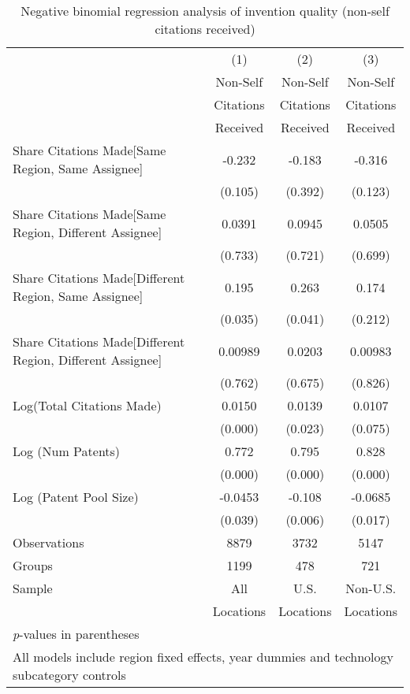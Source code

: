 {
\def\sym#1{\ifmmode^{#1}\else\(^{#1}\)\fi}
\begin{longtable}{l*{3}{c}}
\caption{Negative binomial regression analysis of invention quality (non-self citations received) \label{model192021}}\\
\hline\hline\endfirsthead\hline\endhead\hline\endfoot\endlastfoot
                &\multicolumn{1}{c}{(1)}&\multicolumn{1}{c}{(2)}&\multicolumn{1}{c}{(3)}\\
                &\multicolumn{1}{c}{Non-Self}&\multicolumn{1}{c}{Non-Self}&\multicolumn{1}{c}{Non-Self}\\
                &\multicolumn{1}{c}{Citations}&\multicolumn{1}{c}{Citations}&\multicolumn{1}{c}{Citations}\\
                &\multicolumn{1}{c}{Received}&\multicolumn{1}{c}{Received}&\multicolumn{1}{c}{Received}\\
\hline
Share Citations Made[Same Region, Same Assignee]&   -0.232         &   -0.183         &   -0.316         \\
                &  (0.105)         &  (0.392)         &  (0.123)         \\
Share Citations Made[Same Region, Different Assignee]&   0.0391         &   0.0945         &   0.0505         \\
                &  (0.733)         &  (0.721)         &  (0.699)         \\
Share Citations Made[Different Region, Same Assignee]&    0.195  &    0.263  &    0.174         \\
                &  (0.035)         &  (0.041)         &  (0.212)         \\
Share Citations Made[Different Region, Different Assignee]&  0.00989         &   0.0203         &  0.00983         \\
                &  (0.762)         &  (0.675)         &  (0.826)         \\
Log(Total Citations Made)&   0.0150&   0.0139  &   0.0107         \\
                &  (0.000)         &  (0.023)         &  (0.075)         \\
Log (Num Patents)&    0.772&    0.795&    0.828\\
                &  (0.000)         &  (0.000)         &  (0.000)         \\
Log (Patent Pool Size)&  -0.0453  &   -0.108 &  -0.0685  \\
                &  (0.039)         &  (0.006)         &  (0.017)         \\
\hline
Observations    &     8879         &     3732         &     5147         \\
Groups          &     1199         &      478         &      721         \\
Sample&All &U.S. &Non-U.S. \\
          &Locations &Locations&Locations \\
\hline\hline
\multicolumn{4}{l}{\small \textit{p}-values in parentheses}\\
\multicolumn{4}{l}{\small All models include region fixed effects, year dummies and technology subcategory controls}\\
\end{longtable}
}
